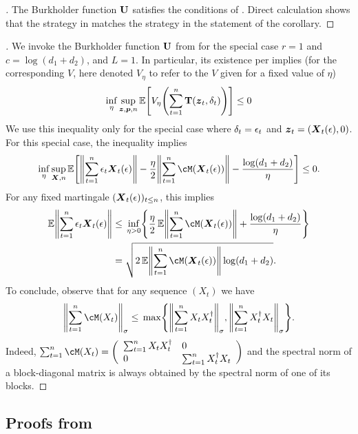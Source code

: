 \begin{proof}[]
  The Burkholder function $\mathbf{U}$ satisfies the conditions of . Direct calculation shows that the strategy in  matches the strategy in the statement of the corollary.
\end{proof}

\begin{proof}[]
  We invoke the Burkholder function $\mathbf{U}$ from  for the special case $r=1$ and $c=\log(d_1 + d_2)$, and $L=1$. In particular, its existence per  implies (for the corresponding $V$, here denoted $V_{\eta}$ to refer to the $V$ given for a fixed value of $\eta$)
  \[
    \inf_{\eta}\sup_{\mb{z},\mb{p}, n}\En\brk*{V_{\eta}\prn*{\sum_{t=1}^{n}\suff(\mb{z}_t, \dl_{t})}}\leq{}0
  \]
  We use this inequality only for the special case where $\delta_{t}=\epsilon_{t}$ and $\boldsymbol{z}_t=(\boldsymbol{X}_{t}(\epsilon), 0)$. For this special case, the inequality implies
    \[
      \inf_{\eta}\sup_{\mb{X}, n}\En\brk*{\nrm*{\sum_{t=1}^{n}\eps_t\mb{X}_{t}(\eps)} - \frac{\eta}{2}\nrm*{\sum_{t=1}^{n}\cM(\mb{X}_{t}(\eps))} - \frac{\log(d_1 + d_2)}
        {\eta} }\leq{}0.
    \]
    For any fixed martingale $(\boldsymbol{X}_{t}(\epsilon))_{t\leq{}n}$, this implies
    \begin{align*}
      \En\nrm*{\sum_{t=1}^{n}\eps_t\mb{X}_{t}(\eps)} &\leq{} \inf_{\eta>0}\crl*{\frac{\eta}{2}\En\nrm*{\sum_{t=1}^{n}\cM(\mb{X}_{t}(\eps))} + \frac{\log(d_1 + d_2)}{\eta} } \\ &= \sqrt{2\En\nrm*{\sum_{t=1}^{n}\cM(\mb{X}_{t}(\eps))}\log(d_1 + d_2)}.
    \end{align*}
	To conclude, observe that for any sequence $(X_t)$ we have  
	  \[
	    \nrm*{\sum_{t=1}^{n}\cM(X_t)}_{\sigma} \leq{}  \max\crl*{\nrm*{\sum_{t=1}^{n}X_tX_t^{\trn}}_{\sigma}, \nrm*{\sum_{t=1}^{n}X_t^{\trn}X_t}_{\sigma}}.
	  \]
	  Indeed, $\sum_{t=1}^{n}\cM(X_t)  = \left(
	  \begin{array}{ll}
	  \sum_{t=1}^{n}X_tX_t^{\trn}& 0\\
	  0 & \sum_{t=1}^{n}X_t^{\trn}X_t
	  \end{array}
	  \right)$ and the spectral norm of a block-diagonal matrix is always obtained by the spectral norm of one of its blocks.
    


\end{proof}

\subsection{Proofs from }
\label{app:square}

